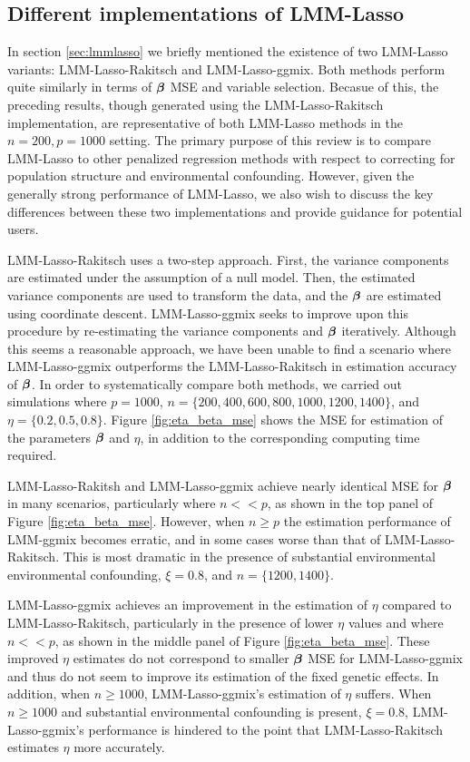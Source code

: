 \subsection{Different implementations of LMM-Lasso}

In section \ref{sec:lmmlasso} we briefly mentioned the existence of two LMM-Lasso variants: LMM-Lasso-Rakitsch and LMM-Lasso-ggmix. Both methods perform quite similarly in terms of $\boldsymbol{\beta}{}$ MSE and variable selection. Becasue of this, the preceding results, though generated using the LMM-Lasso-Rakitsch implementation, are representative of both LMM-Lasso methods in the $n = 200, p = 1000$ setting. The primary purpose of this review is to compare LMM-Lasso to other penalized regression methods with respect to correcting for population structure and environmental confounding. However, given the generally strong performance of LMM-Lasso, we also wish to discuss the key differences between these two implementations and provide guidance for potential users.

LMM-Lasso-Rakitsch uses a two-step approach. First, the variance components are estimated under the assumption of a null model. Then, the estimated variance components are used to transform the data, and the $\boldsymbol{\beta}{}$ are estimated using coordinate descent. LMM-Lasso-ggmix seeks to improve upon this procedure by re-estimating the variance components and $\boldsymbol{\beta}{}$ iteratively. Although this seems a reasonable approach, we have been unable to find a scenario where LMM-Lasso-ggmix outperforms the LMM-Lasso-Rakitsch in estimation accuracy of $\boldsymbol{\beta}{}$. In order to systematically compare both methods, we carried out simulations where $p = 1000$, $n = \{200, 400, 600, 800, 1000, 1200, 1400\}$, and $\eta = \{0.2, 0.5, 0.8\}$. Figure \ref{fig:eta_beta_mse} shows the MSE for estimation of the parameters $\boldsymbol{\beta}{}$ and $\eta$, in addition to the corresponding computing time required. 

LMM-Lasso-Rakitsh and LMM-Lasso-ggmix achieve nearly identical MSE for $\boldsymbol{\beta}{}$ in many scenarios, particularly where $n << p$, as shown in the top panel of Figure \ref{fig:eta_beta_mse}. However, when $n \ge p$ the estimation performance of LMM-ggmix becomes erratic, and in some cases worse than that of LMM-Lasso-Rakitsch. This is most dramatic in the presence of substantial environmental environmental confounding, $\xi = 0.8$, and $n = \{1200, 1400\}$. 

LMM-Lasso-ggmix achieves an improvement in the estimation of $\eta$ compared to LMM-Lasso-Rakitsch, particularly in the presence of lower $\eta$ values and where $n << p$, as shown in the middle panel of Figure \ref{fig:eta_beta_mse}. These improved $\eta$ estimates do not correspond to smaller $\boldsymbol{\beta}{}$ MSE for LMM-Lasso-ggmix and thus do not seem to improve its estimation of the fixed genetic effects. In addition, when $n \ge 1000$, LMM-Lasso-ggmix's estimation of $\eta$ suffers. When $n \ge 1000$ and substantial environmental confounding is present, $\xi = 0.8$,  LMM-Lasso-ggmix's performance is hindered to the point that LMM-Lasso-Rakitsch estimates $\eta$ more accurately.

